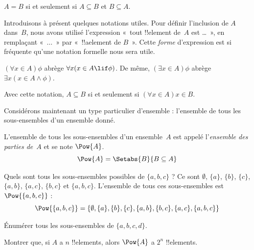 \documentclass[../../../include/open-logic-section]{subfiles}
\begin{document}
\begin{prop}
$A = B$ si et seulement si $A \subseteq B$ et $B \subseteq A$.
\end{prop}

Introduisons à présent quelques notations utiles. Pour définir
l'inclusion de $A$ dans~$B$, nous avons utilisé l'expression
«~tout !!{element} de~$A$ est \dots~», en remplaçant «~$\dots$~»
par «~!!a{element} de $B$~». Cette \emph{forme}
d'expression est si fréquente qu'une notation formelle nous
sera utile.

\begin{defn}
$(\forall x \in A)\phi$ abrège $\forall x(x \in A \lif
\phi)$. De même, $(\exists x \in A)\phi$ abrège $\exists x(x
\in A \land \phi)$.
\end{defn}

Avec cette notation, $A \subseteq B$ si et seulement si
$(\forall x \in A)x \in B$.

Considérons maintenant un type particulier d'ensemble :
l'ensemble de tous les sous-ensembles d'un ensemble donné.

\begin{defn}
L'ensemble de tous les sous-ensembles d'un ensemble~$A$ est appelé
l'\emph{ensemble des parties de}~$A$ et se note $\Pow{A}$.
  \[
    \Pow{A} = \Setabs{B}{B \subseteq A}
  \]
\end{defn}

\begin{ex}
Quels sont tous les sous-ensembles possibles de $\{ a, b, c \}$ ?
Ce sont $\emptyset$, $\{a \}$, $\{b\}$, $\{c\}$, $\{a, b\}$,
$\{a, c\}$, $\{b, c\}$ et $\{a, b, c\}$. L'ensemble de tous
ces sous-ensembles est $\Pow{\{a,b,c\}}$ :
\[
\Pow{\{ a, b, c \}} = \{\emptyset, \{a \}, \{b\}, \{c\}, \{a, b\},
\{b, c\}, \{a, c\}, \{a, b, c\}\}
\]
\end{ex}

\begin{prob}
Énumérer tous les sous-ensembles de $\{a, b, c, d\}$.
\end{prob}

\begin{prob}
Montrer que, si $A$ a $n$ !!{element}s, alors $\Pow{A}$ a
$2^n$ !!{element}s.
\end{prob}
\end{document}
